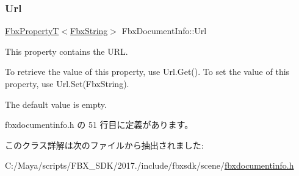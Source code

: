 \subsubsection{\texorpdfstring{Url}{Url}}
{\footnotesize\ttfamily \hyperlink{class_fbx_property_t}{Fbx\+PropertyT}$<$\hyperlink{class_fbx_string}{Fbx\+String}$>$ Fbx\+Document\+Info\+::\+Url}

This property contains the U\+RL.

To retrieve the value of this property, use Url.\+Get(). To set the value of this property, use Url.\+Set(\+Fbx\+String).

The default value is empty. 

 fbxdocumentinfo.\+h の 51 行目に定義があります。



このクラス詳解は次のファイルから抽出されました\+:\begin{DoxyCompactItemize}
\item 
C\+:/\+Maya/scripts/\+F\+B\+X\+\_\+\+S\+D\+K/2017./include/fbxsdk/scene/\hyperlink{fbxdocumentinfo_8h}{fbxdocumentinfo.\+h}\end{DoxyCompactItemize}
